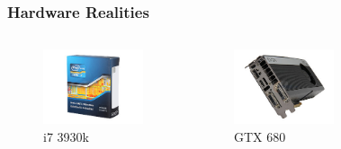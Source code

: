 \documentclass[12pt]{beamer}
\begin{document}
\begin{frame}
\frametitle{Hardware Realities}
\vspace{-12pt}
\begin{columns}
\begin{figure}
\includegraphics[width=\textwidth]{img/i73930k}
\caption{i7 3930k}
\end{figure}
\begin{figure}
\includegraphics[width=\textwidth]{img/gtx680}
\caption{GTX 680}
\end{figure}
\vspace{9pt}
\begin{figure}

\end{figure}
\end{columns}
\end{frame}
\end{document}
